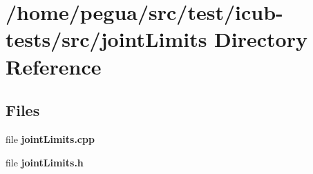 \section{/home/pegua/src/test/icub-\/tests/src/joint\-Limits Directory Reference}
\label{dir_52bb83cdfa78eea1d57abbea3c8e3d28}
\subsection*{Files}
\begin{DoxyCompactItemize}
\item 
file {\bfseries joint\-Limits.\-cpp}
\item 
file {\bfseries joint\-Limits.\-h}
\end{DoxyCompactItemize}
